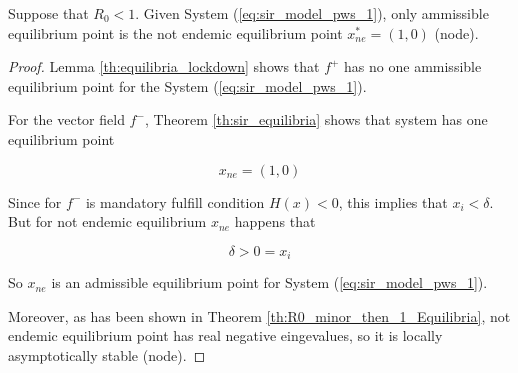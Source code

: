 \begin{theorem}
Suppose that $R_0 < 1$. Given System (\ref{eq:sir_model_pws_1}), only ammissible equilibrium point is the not endemic equilibrium point $x_{ne}^*=(1,0)$ (node).
\end{theorem}

\begin{proof}
Lemma \ref{th:equilibria_lockdown} shows that $f^+$ has no one ammissible equilibrium point for the System (\ref{eq:sir_model_pws_1}).

For the vector field $f^-$, Theorem \ref{th:sir_equilibria} shows that system has one equilibrium point

\begin{equation}
    x_{ne} = (1,0)
\end{equation}

Since for $f^-$ is mandatory fulfill condition $H(x) < 0$, this implies that $x_i < \delta$. But for not endemic equilibrium $x_{ne}$ happens that

\begin{equation}
    \delta > 0 = x_i
\end{equation}

So $x_{ne}$ is an admissible equilibrium point for System (\ref{eq:sir_model_pws_1}).

Moreover, as has been shown in Theorem \ref{th:R0_minor_then_1_Equilibria}, not endemic equilibrium point has real negative eingevalues, so it is locally asymptotically stable (node).
\end{proof}